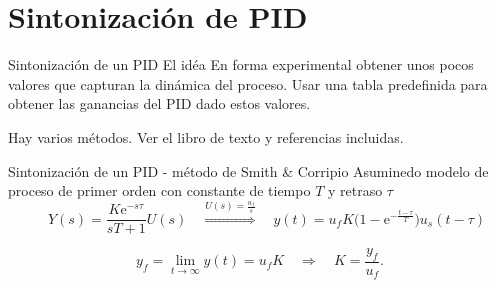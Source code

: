 \documentclass[presentation,aspectratio=1610]{beamer}
\begin{document}
\section{Sintonización de PID}
\label{sec:orgbff0dee}
\begin{frame}[label={sec:org85e1cf1}]{Sintonización de un PID}
\alert{El idéa} En forma experimental obtener unos pocos valores que capturan la dinámica del proceso. Usar una tabla predefinida para obtener las ganancias del PID dado estos valores.

Hay varios métodos. Ver el libro de texto y referencias incluidas.
\end{frame}

\begin{frame}[label={sec:org163b12c}]{Sintonización de un PID - método de Smith \& Corripio}
Asuminedo modelo de proceso de primer orden con constante de tiempo \(T\) y retraso \(\tau\)
\[  \quad Y(s) = \frac{K\mathrm{e}^{-s\tau}}{sT + 1}U(s) \quad \overset{U(s) = \frac{u_f}{s}}{\Longrightarrow} \quad y(t) = u_f K\big( 1 - \mathrm{e}^{-\frac{t-\tau}{T}}\big)u_s(t-\tau)\]
\def\Tcnst{3}
\def\tdelay{0.6}
\def\ggain{2}
\def\uampl{0.8}
\pgfmathsetmacro{\yfinal}{\uampl*\ggain}
\pgfmathsetmacro{\tone}{\tdelay + \Tcnst/3}
\pgfmathsetmacro{\two}{\tdelay + \Tcnst}

\begin{center}
\end{center}

\[ y_f = \lim_{t\to\infty} y(t) = u_f K \quad \Rightarrow \quad K = \frac{y_f}{u_f}. \]
\end{frame}
\end{document}
